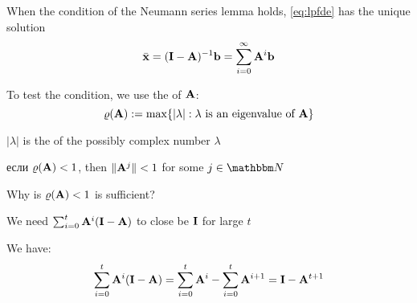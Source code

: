 \begin{frame}

    \vspace{.7em}
    When the condition of the Neumann series lemma holds, \eqref{eq:lpfde}
    has the unique solution
    \begin{equation*}
        \bar {{\mathbf x}} 
        = (\mathbf I - \mathbf A)^{-1} {\mathbf b} 
        = \sum_{i=0}^{\infty} \mathbf A^i  {\mathbf b} 
    \end{equation*}
    
    To test the condition, we use the   of
    $\mathbf A$:
    \begin{equation*}
        \label{eq:srmn}
        \varrho(\mathbf A) := \max \{  |\lambda|  :  \lambda \text{ is an eigenvalue of } \mathbf A \}
    \end{equation*}
    
    \vspace{1em}
    $|\lambda|$ is the  of the possibly complex number
    $\lambda$
    

\end{frame}

\begin{frame}

    \vspace{2em}
    \Fact
    если $\varrho(\mathbf A) < 1$, then $\| \mathbf A^j \| < 1$ for some $j \in \NN$
    
    \vspace{.7em}
    Why is $\varrho(\mathbf A) < 1$ is sufficient?
    
    We need
    $\sum_{i=0}^t \mathbf A^i (\mathbf I - \mathbf A)$ to close be $\mathbf I$ for
    large $t$
    
    We have:
    \begin{equation*}
        \sum_{i=0}^t \mathbf A^i (\mathbf I - \mathbf A)
        =
        \sum_{i=0}^t \mathbf A^i - \sum_{i=0}^t \mathbf A^{i+1}
        =
        \mathbf I - \mathbf A^{t+1}
    \end{equation*}

\end{frame}


